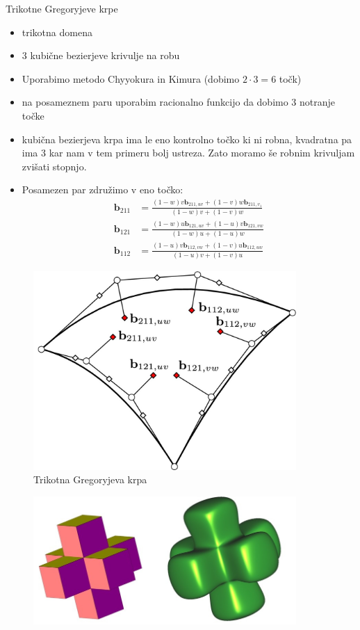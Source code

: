 \documentclass[a4paper,8pt]{beamer}
\newcommand{\tbf}{\textbf}
\begin{document}
\begin{frame}{Trikotne Gregoryjeve krpe}
	\begin{itemize}
		\item trikotna domena
		\item 3 kubične bezierjeve krivulje na robu
		\item Uporabimo metodo Chyyokura in Kimura (dobimo $2 \cdot 3 = 6$ točk)
		\item na posameznem paru uporabim racionalno funkcijo da dobimo 3 notranje točke
		\item kubična bezierjeva krpa ima le eno kontrolno točko ki ni robna, kvadratna pa ima 3 kar nam v tem primeru bolj ustreza. Zato moramo še robnim krivuljam zvišati stopnjo.
		\item Posamezen par združimo v eno točko:
		\begin{align*}
		\tbf{b}_{211} &= \frac{(1-w)v \tbf{b}_{211,uv}+(1-v)w\tbf{b}_{211,v_1}}{(1-w)v+(1-v)w} \\
		\tbf{b}_{121} &= \frac{(1-w)u \tbf{b}_{121,uv}+(1-u)v\tbf{b}_{121,vw}}{(1-w)u+(1-u)w} \\
		\tbf{b}_{112} &= \frac{(1-u)v \tbf{b}_{112,vw}+(1-v)u\tbf{b}_{112,uw}}{(1-u)v+(1-v)u} 
		\end{align*}
	\end{itemize}
\end{frame}
\begin{frame}
	\begin{figure}[h]
		\centering
		\includegraphics[width=10cm]{gregory_krpe_trikotna.jpg}
		\caption{Trikotna Gregoryjeva krpa}
	\end{figure}
\end{frame}

\begin{frame}
	\begin{figure}[h]
		\centering
		\includegraphics[width=10cm]{posebna_kocka.jpg}
	\end{figure}
\end{frame}
\end{document}
